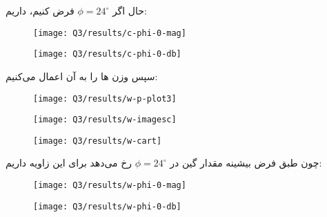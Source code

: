 \documentclass[12pt,onecolumn,a4paper]{article}
\begin{document}
حال اگر $\phi = 24^\circ$ فرض کنیم، داریم:
\begin{figure}[H]
	\centering
	\texttt{[image: Q3/results/c-phi-0-mag]}
	\caption{}
	\label{fig:c-phi-0-mag}
\end{figure}
\begin{figure}[H]
	\centering
	\texttt{[image: Q3/results/c-phi-0-db]}
	\caption{}
	\label{fig:c-phi-0-db}
\end{figure}



%	
	
	

	
	
سپس وزن ها را به آن اعمال می‌کنیم:
\begin{figure}[H]
	\centering
	\texttt{[image: Q3/results/w-p-plot3]}
	\caption{}
	\label{fig:w-p-plot3}
\end{figure}

\begin{figure}[H]
	\centering
	\texttt{[image: Q3/results/w-imagesc]}
	\caption{}
	\label{fig:w-imagesc}
\end{figure}

\begin{figure}[H]
	\centering
	\texttt{[image: Q3/results/w-cart]}
	\caption{}
	\label{fig:w-cart}
\end{figure}



چون طبق فرض بیشینه مقدار گین در $\phi = 24^\circ$ رخ می‌دهد برای این زاویه داریم:

\begin{figure}[H]
	\centering
	\texttt{[image: Q3/results/w-phi-0-mag]}
	\caption{}
	\label{fig:w-phi-0-mag}
\end{figure}
\begin{figure}[H]
	\centering
	\texttt{[image: Q3/results/w-phi-0-db]}
	\caption{}
	\label{fig:w-phi-0-db}
\end{figure}
\end{document}
